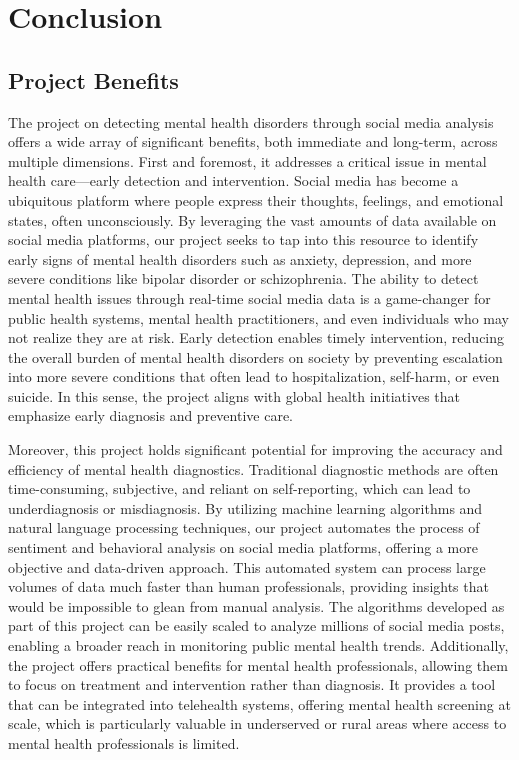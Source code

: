 
\section{Conclusion}

\subsection{Project Benefits}
\noindent
The project on detecting mental health disorders through social media analysis offers a wide array of significant benefits, both immediate and long-term, across multiple dimensions. First and foremost, it addresses a critical issue in mental health care—early detection and intervention. Social media has become a ubiquitous platform where people express their thoughts, feelings, and emotional states, often unconsciously. By leveraging the vast amounts of data available on social media platforms, our project seeks to tap into this resource to identify early signs of mental health disorders such as anxiety, depression, and more severe conditions like bipolar disorder or schizophrenia. The ability to detect mental health issues through real-time social media data is a game-changer for public health systems, mental health practitioners, and even individuals who may not realize they are at risk. Early detection enables timely intervention, reducing the overall burden of mental health disorders on society by preventing escalation into more severe conditions that often lead to hospitalization, self-harm, or even suicide. In this sense, the project aligns with global health initiatives that emphasize early diagnosis and preventive care. 

\vspace{1em}
\noindent
Moreover, this project holds significant potential for improving the accuracy and efficiency of mental health diagnostics. Traditional diagnostic methods are often time-consuming, subjective, and reliant on self-reporting, which can lead to underdiagnosis or misdiagnosis. By utilizing machine learning algorithms and natural language processing techniques, our project automates the process of sentiment and behavioral analysis on social media platforms, offering a more objective and data-driven approach. This automated system can process large volumes of data much faster than human professionals, providing insights that would be impossible to glean from manual analysis. The algorithms developed as part of this project can be easily scaled to analyze millions of social media posts, enabling a broader reach in monitoring public mental health trends. Additionally, the project offers practical benefits for mental health professionals, allowing them to focus on treatment and intervention rather than diagnosis. It provides a tool that can be integrated into telehealth systems, offering mental health screening at scale, which is particularly valuable in underserved or rural areas where access to mental health professionals is limited. 


